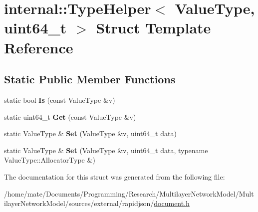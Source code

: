\hypertarget{structinternal_1_1TypeHelper_3_01ValueType_00_01uint64__t_01_4}{}\section{internal\+:\+:Type\+Helper$<$ Value\+Type, uint64\+\_\+t $>$ Struct Template Reference}
\label{structinternal_1_1TypeHelper_3_01ValueType_00_01uint64__t_01_4}
\subsection*{Static Public Member Functions}
\begin{DoxyCompactItemize}
\item 
static bool {\bfseries Is} (const Value\+Type \&v)\hypertarget{structinternal_1_1TypeHelper_3_01ValueType_00_01uint64__t_01_4_a4916651732ed27fa944c96a32cec5b88}{}\label{structinternal_1_1TypeHelper_3_01ValueType_00_01uint64__t_01_4_a4916651732ed27fa944c96a32cec5b88}

\item 
static uint64\+\_\+t {\bfseries Get} (const Value\+Type \&v)\hypertarget{structinternal_1_1TypeHelper_3_01ValueType_00_01uint64__t_01_4_a1b1b2e4fe3c38fb37701284c6571ee92}{}\label{structinternal_1_1TypeHelper_3_01ValueType_00_01uint64__t_01_4_a1b1b2e4fe3c38fb37701284c6571ee92}

\item 
static Value\+Type \& {\bfseries Set} (Value\+Type \&v, uint64\+\_\+t data)\hypertarget{structinternal_1_1TypeHelper_3_01ValueType_00_01uint64__t_01_4_a38392035fe5a647078b24f0e15a84145}{}\label{structinternal_1_1TypeHelper_3_01ValueType_00_01uint64__t_01_4_a38392035fe5a647078b24f0e15a84145}

\item 
static Value\+Type \& {\bfseries Set} (Value\+Type \&v, uint64\+\_\+t data, typename Value\+Type\+::\+Allocator\+Type \&)\hypertarget{structinternal_1_1TypeHelper_3_01ValueType_00_01uint64__t_01_4_a3c8b01c3e9a9e63c99bef2db9fdf3823}{}\label{structinternal_1_1TypeHelper_3_01ValueType_00_01uint64__t_01_4_a3c8b01c3e9a9e63c99bef2db9fdf3823}

\end{DoxyCompactItemize}


The documentation for this struct was generated from the following file\+:\begin{DoxyCompactItemize}
\item 
/home/mate/\+Documents/\+Programming/\+Research/\+Multilayer\+Network\+Model/\+Multilayer\+Network\+Model/sources/external/rapidjson/\hyperlink{document_8h}{document.\+h}\end{DoxyCompactItemize}
